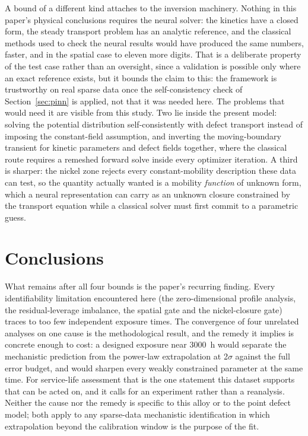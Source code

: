 \documentclass[pdflatex,sn-nature]{sn-jnl}
\begin{document}
A bound of a different kind attaches to the inversion machinery. Nothing
in this paper's physical conclusions requires the neural solver: the
kinetics have a closed form, the steady transport problem has an
analytic reference, and the classical methods used to check the neural
results would have produced the same numbers, faster, and in the spatial
case to eleven more digits. That is a deliberate property of the test
case rather than an oversight, since a validation is possible only where
an exact reference exists, but it bounds the claim to this: the
framework is trustworthy on real sparse data once the self-consistency
check of Section~\ref{sec:pinn} is applied, not that it was needed here.
The problems that would need it are visible from this study. Two lie
inside the present model: solving the potential distribution
self-consistently with defect transport instead of imposing the
constant-field assumption, and inverting the moving-boundary transient
for kinetic parameters and defect fields together, where the classical
route requires a remeshed forward solve inside every optimizer
iteration. A third is sharper: the nickel zone rejects every
constant-mobility description these data can test, so the quantity
actually wanted is a mobility \emph{function} of unknown form, which a
neural representation can carry as an unknown closure constrained by the
transport equation while a classical solver must first commit to a
parametric guess.

\section{Conclusions}\label{sec:conclusions}

What remains after all four bounds is the paper's recurring finding.
Every identifiability limitation encountered here (the zero-dimensional
profile analysis, the residual-leverage imbalance, the spatial gate and
the nickel-closure gate) traces to too few independent exposure times.
The convergence of four unrelated analyses on one cause is the
methodological result, and the remedy it implies is concrete enough to
cost: a designed exposure near 3000~h would separate the mechanistic
prediction from the power-law extrapolation at 2$\sigma$ against the full
error budget, and would sharpen every weakly constrained parameter at the
same time. For service-life assessment that is the one statement
this dataset supports that can be acted on, and it calls for an
experiment rather than a reanalysis.
Neither the cause nor the remedy is specific to this alloy or to the
point defect model; both apply to any sparse-data mechanistic
identification in which extrapolation beyond the calibration window is
the purpose of the fit.
\end{document}
